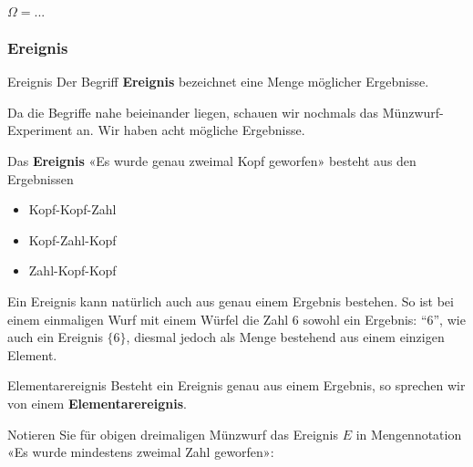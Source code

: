 $\Omega=...$



\subsubsection{Ereignis}
\begin{definition}{Ereignis}{}
Der Begriff \textbf{Ereignis} bezeichnet eine Menge möglicher
Ergebnisse.
\end{definition}

Da die Begriffe nahe beieinander liegen, schauen wir
nochmals das Münzwurf-Experiment an. Wir haben acht mögliche
Ergebnisse. 

Das \textbf{Ereignis} «Es wurde genau zweimal Kopf geworfen» besteht
aus den Ergebnissen

\begin{itemize}
\item Kopf-Kopf-Zahl
\item Kopf-Zahl-Kopf
\item Zahl-Kopf-Kopf
\end{itemize}

\begin{bemerkung}{}{}
  Ein Ereignis kann natürlich auch aus genau einem Ergebnis bestehen. So ist bei einem einmaligen Wurf mit einem Würfel die Zahl 6 sowohl ein Ergebnis: ``6'', wie auch ein Ereignis $\{6\}$, diesmal jedoch als Menge bestehend aus einem einzigen Element. 
  \end{bemerkung}

\begin{definition}{Elementarereignis}{}
Besteht ein Ereignis genau aus einem Ergebnis, so sprechen wir von einem \textbf{Elementarereignis}.
\end{definition}

Notieren Sie für obigen dreimaligen Münzwurf das Ereignis $E$ in Mengennotation «Es wurde mindestens
zweimal Zahl geworfen»:

